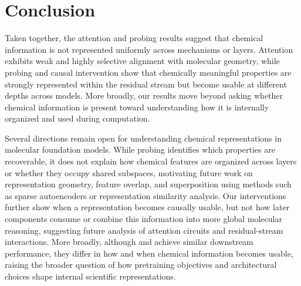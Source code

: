 \section{Conclusion}
\label{sec:conclusion}

Taken together, the attention and probing results suggest that chemical information is not represented uniformly across mechanisms or layers. Attention exhibits weak and highly selective alignment with molecular geometry, while probing and causal intervention show that chemically meaningful properties are strongly represented within the residual stream but become usable at different depths across models. More broadly, our results move beyond asking whether chemical information is present toward understanding how it is internally organized and used during computation.

Several directions remain open for understanding chemical representations in molecular foundation models. While probing identifies which properties are recoverable, it does not explain how chemical features are organized across layers or whether they occupy shared subspaces, motivating future work on representation geometry, feature overlap, and superposition using methods such as sparse autoencoders or representation similarity analysis. Our interventions further show when a representation becomes causally usable, but not how later components consume or combine this information into more global molecular reasoning, suggesting future analysis of attention circuits and residual-stream interactions. More broadly, although \molm and \smi achieve similar downstream performance, they differ in how and when chemical information becomes usable, raising the broader question of how pretraining objectives and architectural choices shape internal scientific representations.